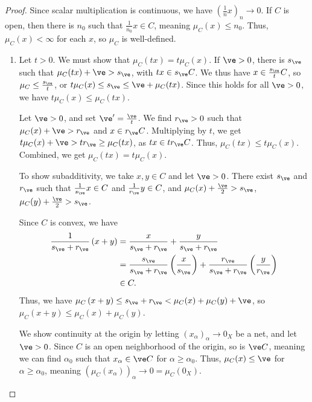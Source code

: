 \documentclass[10pt]{mypackage}
\begin{document}
\begin{proof}
  Since scalar multiplication is continuous, we have $\left(\frac{1}{n}x\right)_{n}\rightarrow 0$. If $C$ is open, then there is $n_0$ such that $\frac{1}{n_0}x \in C$, meaning $\mu_C(x) \leq n_0$. Thus, $\mu_{C}(x) < \infty$ for each $x$, so $\mu_{C}$ is well-defined.
  \begin{enumerate}[(1)]
    \item Let $t > 0$. We must show that $\mu_{C}\left(tx\right) = t\mu_{C}(x)$. If $\ve > 0$, there is $s_{\ve} $ such that $\mu_{C}(tx) + \ve > s_{\ve}$, with $tx\in s_{\ve}C$. We thus have $x\in \frac{s_{\ve}}{t}C$, so $\mu_{C} \leq \frac{s_{\ve}}{t}$, or $t\mu_{C}(x) \leq s_{\ve} \leq \ve + \mu_{C}(tx)$. Since this holds for all $\ve > 0$, we have $t\mu_{C}(x) \leq \mu_{C}(tx)$.\newline

      Let $\ve > 0$, and set $\ve' = \frac{\ve}{t}$. We find $r_{\ve} > 0$ such that $\mu_{C}(x) + \ve > r_{\ve}$ and $x\in r_{\ve} C$. Multiplying by $t$, we get $t\mu_{C}(x) + \ve > t r_{\ve} \geq \mu_{C}(tx)$, as $tx\in tr_{\ve}C$. Thus, $\mu_{C}(tx) \leq t\mu_{C}(x)$. Combined, we get $\mu_{C}(tx) = t\mu_{C}(x)$.\newline

      To show subadditivity, we take $x,y\in C$ and let $\ve > 0$. There exist $s_{\ve}$ and $r_{\ve}$ such that $\frac{1}{s_{\ve}}x \in C$ and $\frac{1}{r_{\ve}}y \in C$, and $\mu_{C}(x) + \frac{\ve}{2} > s_{\ve}$, $\mu_{C}(y) + \frac{\ve}{2} > s_{\ve}$.\newline

      Since $C$ is convex, we have
      \begin{align*}
        \frac{1}{s_{\ve} + r_{\ve}}\left(x+y\right) &= \frac{x}{s_{\ve} + r_{\ve}} + \frac{y}{s_{\ve} + r_{\ve}}\\
                                                    &= \frac{s_{\ve}}{s_{\ve} + r_{\ve}} \left(\frac{x}{s_{\ve}}\right) + \frac{r_{\ve}}{s_{\ve} + r_{\ve}} \left(\frac{y}{r_{\ve}}\right)\\
                                                    &\in C.
      \end{align*}
      Thus, we have $\mu_{C}\left(x + y\right) \leq s_{\ve} + r_{\ve} < \mu_{C}(x) + \mu_{C}(y) + \ve$, so $\mu_{C}(x+y) \leq \mu_{C}(x) + \mu_{C}(y)$.\newline

      We show continuity at the origin by letting $\left(x_{\alpha}\right)_{\alpha}\rightarrow 0_{X}$ be a net, and let $\ve > 0$. Since $C$ is an open neighborhood of the origin, so is $\ve C$, meaning we can find $\alpha_{0}$ such that $x_{\alpha}\in \ve C$ for $\alpha \geq \alpha_{0}$. Thus, $\mu_{C}(x) \leq \ve$ for $\alpha \geq \alpha_{0}$, meaning $\left(\mu_{C}\left(x_{\alpha}\right)\right)_{\alpha}\rightarrow 0 = \mu_{C}\left(0_X\right)$.\newline


\end{enumerate}
\end{proof}
\end{document}
